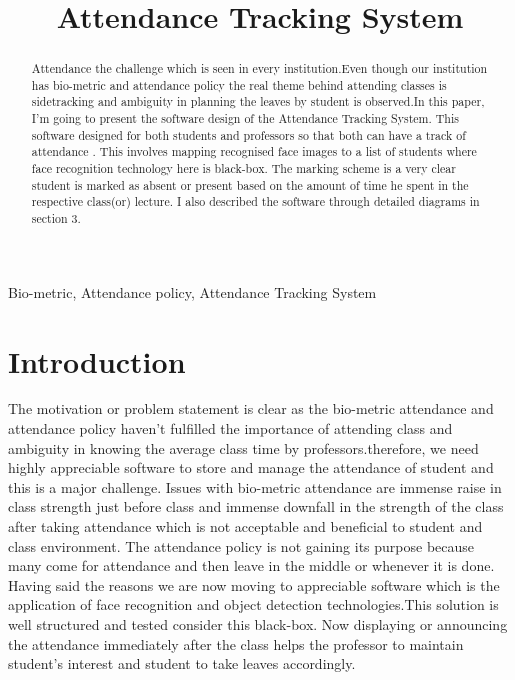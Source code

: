 \documentclass[conference]{IEEEtran}
\begin{document}
\title{Attendance Tracking System\\}

\author{
}


\maketitle

\begin{abstract}
Attendance the challenge which is seen in every institution.Even though our institution has bio-metric and attendance policy the real theme behind attending classes is sidetracking and ambiguity in planning the leaves by student is observed.In this paper, I'm going to present the software design of the Attendance Tracking System. This software designed for both students and professors so that both can have a track of attendance .  This involves mapping recognised face images to a list of students where face recognition technology here is black-box. The marking scheme is a very clear student is marked as absent or present based on the amount of time he spent in the respective class(or) lecture. I also described the software through detailed diagrams in section 3.
\end{abstract}

\begin{IEEEkeywords}
Bio-metric, Attendance policy, Attendance Tracking System
\end{IEEEkeywords}

\section{Introduction}
The motivation or problem statement is clear as the bio-metric attendance and attendance policy haven't fulfilled the importance of attending class and ambiguity in knowing the average class time by professors.therefore, we need highly appreciable software to store and manage the attendance of student and this is a major challenge. Issues with bio-metric attendance are immense raise in class strength just before class and immense downfall in the strength of the class after taking attendance which is not acceptable and beneficial to student and class environment. The attendance policy is not gaining its purpose because many come for attendance and then leave in the middle or whenever it is done. Having said the reasons we are now moving to appreciable software which is the application of face recognition and object detection technologies.This solution is well structured and tested consider this black-box. Now displaying or announcing the attendance immediately after the class  helps the professor to maintain student's interest and student to take leaves accordingly.
\end{document}

